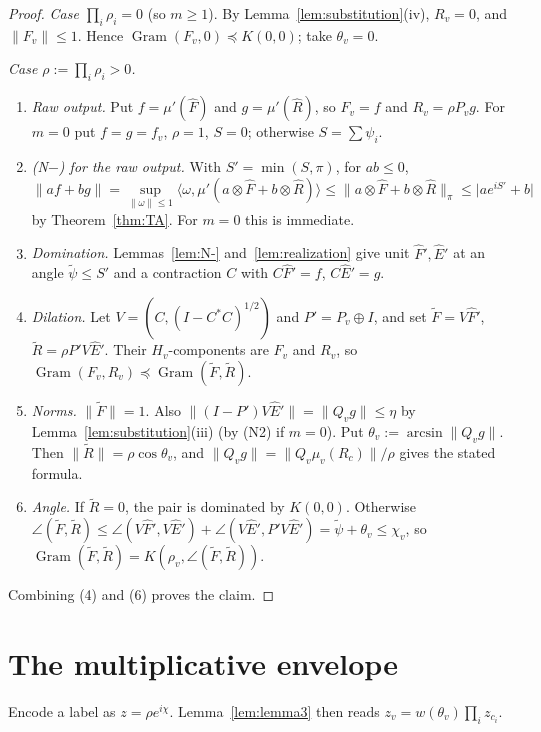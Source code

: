 \documentclass[11pt]{amsart}
\theoremstyle{definition}
\newcommand{\Gram}{\operatorname{Gram}}
\newcommand{\norm}[1]{\lVert #1\rVert}
\newcommand{\abs}[1]{\lvert #1\rvert}
\newcommand{\ip}[2]{\langle #1,#2\rangle}
\begin{document}
\begin{proof}
\emph{Case $\prod_i\rho_i=0$} (so $m\ge1$). By Lemma~\ref{lem:substitution}(iv),
$R_v=0$, and $\norm{F_v}\le1$. Hence $\Gram(F_v,0)\preceq K(0,0)$; take $\theta_v=0$.

\emph{Case $\rho:=\prod_i\rho_i>0$.}
\begin{enumerate}[label=\textup{(\arabic*)}]
\item \emph{Raw output.} Put $f=\mu'(\hat F)$ and $g=\mu'(\hat R)$, so $F_v=f$ and
  $R_v=\rho P_vg$. For $m=0$ put $f=g=f_v$, $\rho=1$, $S=0$; otherwise $S=\sum\psi_i$.
\item \emph{(N$-$) for the raw output.} With $S'=\min(S,\pi)$, for $ab\le0$,
  \[
  \norm{af+bg}=\sup_{\norm\omega\le1}\ip\omega{\mu'(a\otimes\hat F+b\otimes\hat R)}\le\norm{a\otimes\hat F+b\otimes\hat R}_\pi\le\abs{ae^{iS'}+b}
  \]
  by Theorem~\ref{thm:TA}. For $m=0$ this is immediate.
\item \emph{Domination.} Lemmas~\ref{lem:N-} and~\ref{lem:realization} give unit
  $\hat F',\hat E'$ at an angle $\tilde\psi\le S'$ and a contraction $C$ with
  $C\hat F'=f$, $C\hat E'=g$.
\item \emph{Dilation.} Let $V=(C,(I-C^*C)^{1/2})$ and $P'=P_v\oplus I$, and set
  $\tilde F=V\hat F'$, $\tilde R=\rho P'V\hat E'$. Their $H_v$-components are $F_v$
  and $R_v$, so $\Gram(F_v,R_v)\preceq\Gram(\tilde F,\tilde R)$.
\item \emph{Norms.} $\norm{\tilde F}=1$. Also
  $\norm{(I-P')V\hat E'}=\norm{Q_vg}\le\eta$ by Lemma~\ref{lem:substitution}(iii)
  (by (N2) if $m=0$). Put $\theta_v:=\arcsin\norm{Q_vg}$. Then
  $\norm{\tilde R}=\rho\cos\theta_v$, and $\norm{Q_vg}=\norm{Q_v\mu_v(R_c)}/\rho$
  gives the stated formula.
\item \emph{Angle.} If $\tilde R=0$, the pair is dominated by $K(0,0)$. Otherwise
  $\angle(\tilde F,\tilde R)\le\angle(V\hat F',V\hat E')+\angle(V\hat E',P'V\hat E')=\tilde\psi+\theta_v\le\chi_v$,
  so $\Gram(\tilde F,\tilde R)=K(\rho_v,\angle(\tilde F,\tilde R))$.
\end{enumerate}
Combining (4) and (6) proves the claim.
\end{proof}

\section{The multiplicative envelope}\label{sec:envelope}

Encode a label as $z=\rho e^{i\chi}$. Lemma~\ref{lem:lemma3} then reads
$z_v=w(\theta_v)\prod_iz_{c_i}$.
\end{document}
